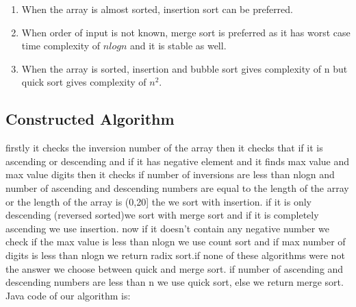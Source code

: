 \documentclass[
10pt, %
a4paper, %
oneside, %
headinclude,footinclude, %
BCOR5mm, %
]{scrartcl}
\begin{document}
\begin{enumerate}[noitemsep]
\item When the array is almost sorted, insertion sort can be preferred.
\item When order of input is not known, merge sort is preferred as it has worst case time complexity of $nlogn$ and it is stable as well.
\item When the array is sorted, insertion and bubble sort gives complexity of n but quick sort gives complexity of $n^2$.

\end{enumerate}






\subsection{Constructed Algorithm}
 firstly it checks the inversion number of the array then it checks that if it is ascending or descending and if it has negative element and it finds max value and max value digits then it checks if number of inversions are less  than nlogn and number of ascending and descending numbers are equal to the length of the array or the length of the array is (0,20] the we sort with insertion. 
 if it is only descending (reversed sorted)we sort with merge sort and if it is completely ascending we use insertion.
 now if it doesn't contain any negative number we check if the max value is less than nlogn we use count sort and if max number of digits is less than nlogn we return radix sort.if none of these algorithms were not the answer we choose between quick and merge sort. if number of ascending and descending numbers are less than n we use quick sort, else we return merge sort.
 \\
Java code of our algorithm is:
\end{document}
